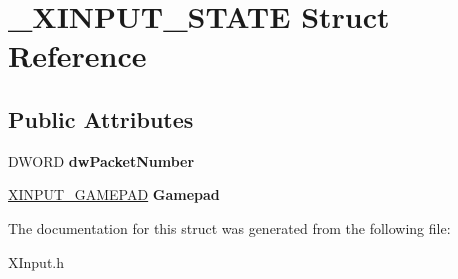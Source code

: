\hypertarget{struct___x_i_n_p_u_t___s_t_a_t_e}{}\section{\+\_\+\+X\+I\+N\+P\+U\+T\+\_\+\+S\+T\+A\+T\+E Struct Reference}
\label{struct___x_i_n_p_u_t___s_t_a_t_e}
\subsection*{Public Attributes}
\begin{DoxyCompactItemize}
\item 
\hypertarget{struct___x_i_n_p_u_t___s_t_a_t_e_ab2439a9094e92032ce57a3692e4c2e5e}{}D\+W\+O\+R\+D {\bfseries dw\+Packet\+Number}\label{struct___x_i_n_p_u_t___s_t_a_t_e_ab2439a9094e92032ce57a3692e4c2e5e}

\item 
\hypertarget{struct___x_i_n_p_u_t___s_t_a_t_e_a5eee32c04cc4419aa6ae2d24a53b56fa}{}\hyperlink{struct___x_i_n_p_u_t___g_a_m_e_p_a_d}{X\+I\+N\+P\+U\+T\+\_\+\+G\+A\+M\+E\+P\+A\+D} {\bfseries Gamepad}\label{struct___x_i_n_p_u_t___s_t_a_t_e_a5eee32c04cc4419aa6ae2d24a53b56fa}

\end{DoxyCompactItemize}


The documentation for this struct was generated from the following file\+:\begin{DoxyCompactItemize}
\item 
X\+Input.\+h\end{DoxyCompactItemize}
